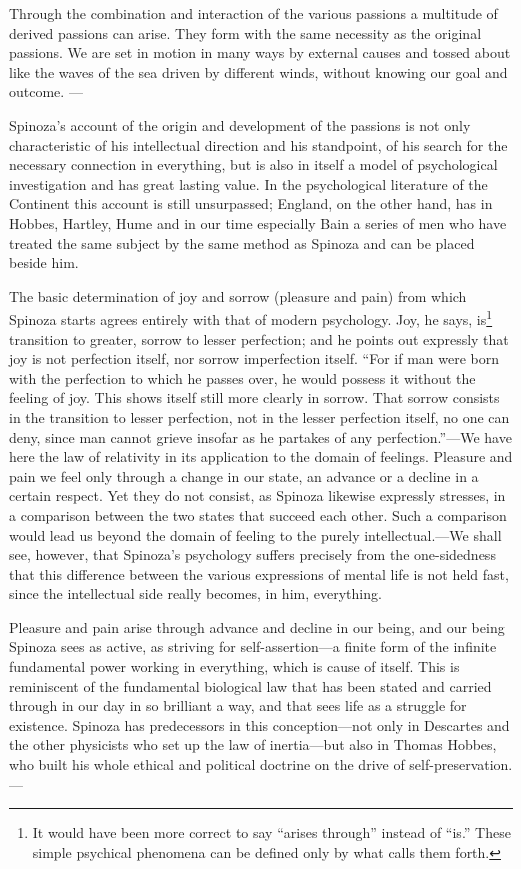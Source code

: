 \documentclass[12pt]{book}
\newcommand{\opage}[1]{\marginnote{\footnotesize\textit{[#1]}}}
\begin{document}
Through the combination and interaction of the various passions a multitude of derived
passions can arise. They form with the same necessity as the original passions. We are
set in motion in many ways by external causes and tossed about like the waves of the sea
driven by different winds, without knowing our goal and outcome. ---

Spinoza's account of the origin and development of the passions is not only
characteristic of his intellectual direction and his standpoint, of his search for the
necessary connection in everything, but is also in itself a model of psychological
investigation and has great lasting value. In the psychological literature of the
Continent \opage{130}this account is still unsurpassed; England, on the other hand, has
in Hobbes, Hartley, Hume and in our time especially Bain a series of men who have
treated the same subject by the same method as Spinoza and can be placed beside him.

The basic determination of joy and sorrow (pleasure and pain) from which Spinoza starts
agrees entirely with that of modern psychology. Joy, he says, is\footnote{It would have
been more correct to say ``arises through'' instead of ``is.'' These simple psychical
phenomena can be defined only by what calls them forth.} transition to greater, sorrow to
lesser perfection; and he points out expressly that joy is not perfection itself, nor
sorrow imperfection itself. ``For if man were born with the perfection to which he
passes over, he would possess it without the feeling of joy. This shows itself still
more clearly in sorrow. That sorrow consists in the transition to lesser perfection, not
in the lesser perfection itself, no one can deny, since man cannot grieve insofar as he
partakes of any perfection.''---We have here the law of relativity in its application to
the domain of feelings. Pleasure and pain we feel only through a change in our state, an
advance or a decline in a certain respect. Yet they do not consist, as Spinoza likewise
expressly stresses, in a comparison between the two states that succeed each other. Such
a comparison would lead us beyond the domain of feeling to the purely intellectual.---We
shall see, however, that Spinoza's psychology \opage{131}suffers precisely from the
one-sidedness that this difference between the various expressions of mental life is not
held fast, since the intellectual side really becomes, in him, everything.

Pleasure and pain arise through advance and decline in our being, and our being Spinoza
sees as active, as striving for self-assertion---a finite form of the infinite
fundamental power working in everything, which is cause of itself. This is reminiscent
of the fundamental biological law that has been stated and carried through in our day in
so brilliant a way, and that sees life as a struggle for existence. Spinoza has
predecessors in this conception---not only in Descartes and the other physicists who set
up the law of inertia---but also in Thomas Hobbes, who built his whole ethical and
political doctrine on the drive of self-preservation.---
\end{document}
